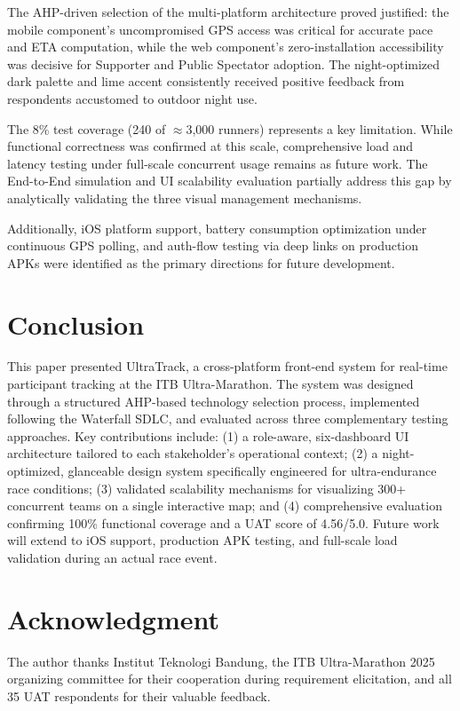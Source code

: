\documentclass[conference]{IEEEtran}
\begin{document}
The AHP-driven selection of the multi-platform architecture proved justified: the mobile component's uncompromised GPS access was critical for accurate pace and ETA computation, while the web component's zero-installation accessibility was decisive for Supporter and Public Spectator adoption. The night-optimized dark palette and lime accent consistently received positive feedback from respondents accustomed to outdoor night use.

The 8\% test coverage (240 of $\approx$3,000 runners) represents a key limitation. While functional correctness was confirmed at this scale, comprehensive load and latency testing under full-scale concurrent usage remains as future work. The End-to-End simulation and UI scalability evaluation partially address this gap by analytically validating the three visual management mechanisms.

Additionally, iOS platform support, battery consumption optimization under continuous GPS polling, and auth-flow testing via deep links on production APKs were identified as the primary directions for future development.

\section{Conclusion}

This paper presented UltraTrack, a cross-platform front-end system for real-time participant tracking at the ITB Ultra-Marathon. The system was designed through a structured AHP-based technology selection process, implemented following the Waterfall SDLC, and evaluated across three complementary testing approaches. Key contributions include: (1) a role-aware, six-dashboard UI architecture tailored to each stakeholder's operational context; (2) a night-optimized, glanceable design system specifically engineered for ultra-endurance race conditions; (3) validated scalability mechanisms for visualizing 300+ concurrent teams on a single interactive map; and (4) comprehensive evaluation confirming 100\% functional coverage and a UAT score of 4.56/5.0. Future work will extend to iOS support, production APK testing, and full-scale load validation during an actual race event.

\section*{Acknowledgment}
The author thanks Institut Teknologi Bandung, the ITB Ultra-Marathon 2025 organizing committee for their cooperation during requirement elicitation, and all 35 UAT respondents for their valuable feedback.
\end{document}
